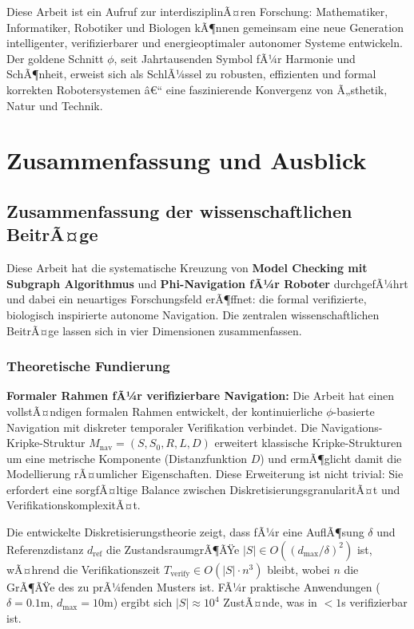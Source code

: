 ﻿\documentclass[a4paper,12pt]{article}
\theoremstyle{definition}
\begin{document}
Diese Arbeit ist ein Aufruf zur interdisziplinÃ¤ren Forschung: Mathematiker, Informatiker, Robotiker und Biologen kÃ¶nnen gemeinsam eine neue Generation intelligenter, verifizierbarer und energieoptimaler autonomer Systeme entwickeln. Der goldene Schnitt $\phi$, seit Jahrtausenden Symbol fÃ¼r Harmonie und SchÃ¶nheit, erweist sich als SchlÃ¼ssel zu robusten, effizienten und formal korrekten Robotersystemen â€“ eine faszinierende Konvergenz von Ã„sthetik, Natur und Technik.

\section{Zusammenfassung und Ausblick}

\subsection{Zusammenfassung der wissenschaftlichen BeitrÃ¤ge}

Diese Arbeit hat die systematische Kreuzung von \textbf{Model Checking mit Subgraph Algorithmus} und \textbf{Phi-Navigation fÃ¼r Roboter} durchgefÃ¼hrt und dabei ein neuartiges Forschungsfeld erÃ¶ffnet: die formal verifizierte, biologisch inspirierte autonome Navigation. Die zentralen wissenschaftlichen BeitrÃ¤ge lassen sich in vier Dimensionen zusammenfassen.

\subsubsection{Theoretische Fundierung}

\textbf{Formaler Rahmen fÃ¼r verifizierbare Navigation:}
Die Arbeit hat einen vollstÃ¤ndigen formalen Rahmen entwickelt, der kontinuierliche $\phi$-basierte Navigation mit diskreter temporaler Verifikation verbindet. Die Navigations-Kripke-Struktur $M_{\text{nav}} = (S, S_0, R, L, D)$ erweitert klassische Kripke-Strukturen um eine metrische Komponente (Distanzfunktion $D$) und ermÃ¶glicht damit die Modellierung rÃ¤umlicher Eigenschaften. Diese Erweiterung ist nicht trivial: Sie erfordert eine sorgfÃ¤ltige Balance zwischen DiskretisierungsgranularitÃ¤t und VerifikationskomplexitÃ¤t.

Die entwickelte Diskretisierungstheorie zeigt, dass fÃ¼r eine AuflÃ¶sung $\delta$ und Referenzdistanz $d_{\text{ref}}$ die ZustandsraumgrÃ¶ÃŸe $|S| \in O((d_{\text{max}}/\delta)^2)$ ist, wÃ¤hrend die Verifikationszeit $T_{\text{verify}} \in O(|S| \cdot n^3)$ bleibt, wobei $n$ die GrÃ¶ÃŸe des zu prÃ¼fenden Musters ist. FÃ¼r praktische Anwendungen ($\delta = 0.1\text{m}$, $d_{\text{max}} = 10\text{m}$) ergibt sich $|S| \approx 10^4$ ZustÃ¤nde, was in $< 1$s verifizierbar ist.
\end{document}
